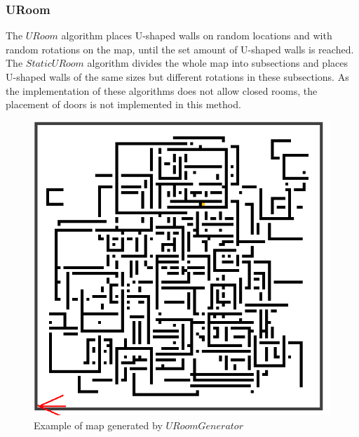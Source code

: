 \subsubsection{URoom}
The $URoom$ algorithm places U-shaped walls on random locations and with random rotations on the map, until the set amount of U-shaped walls is reached.
The $StaticURoom$ algorithm divides the whole map into subsections and places U-shaped walls of the same sizes but different rotations in these subsections.
As the implementation of these algorithms does not allow closed rooms, the placement of doors is not implemented in this method.
\begin{figure}
\centering
\includegraphics[width=\columnwidth]{images/uroom.png}
\caption{Example of map generated by $URoomGenerator$}
\label{fig:uroom}
\end{figure}

